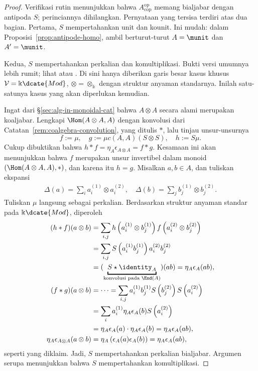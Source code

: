 \begin{proof}
	Verifikasi rutin menunjukkan bahwa
	$A^{\mathrm{op}}_{\mathrm{cop}}$ memang bialjabar dengan antipoda $S$;
	perinciannya dihilangkan. Pernyataan yang tersisa terdiri atas dua bagian.
	Pertama, $S$ mempertahankan unit dan kounit. Ini mudah: dalam
	Proposisi~\ref{prop:antipode-homo}, ambil berturut-turut $A=\munit$ dan
	$A'=\munit$.

	Kedua, $S$ mempertahankan perkalian dan komultiplikasi. Bukti versi umumnya
	lebih rumit; lihat \cite[\S 9, Proposisi 2]{JS91} atau
	\cite[Proposisi 1.22]{AM10}. Di sini hanya diberikan garis besar kasus
	khusus $\mathcal{V}=\Bbbk\dcate{Mod}$,
	$\otimes=\otimes_{\Bbbk}$ dengan struktur anyaman standarnya. Inilah
	satu-satunya kasus yang akan diperlukan kemudian.

	Ingat dari \S\ref{sec:alg-in-monoidal-cat} bahwa $A\otimes A$ secara alami
	merupakan koaljabar. Lengkapi $\Hom(A\otimes A,A)$ dengan konvolusi dari
	Catatan~\ref{rem:coalgebra-convolution}, yang ditulis $\ast$, lalu tinjau
	unsur-unsurnya
	\[ f := \mu, \quad g := \mu c(A, A) (S \otimes S), \quad h := S \mu. 
	\]
	Cukup dibuktikan bahwa
	$h\ast f=\eta_A\epsilon_{A\otimes A}=f\ast g$. Kesamaan ini akan
	menunjukkan bahwa $f$ merupakan unsur invertibel dalam monoid
	$(\Hom(A\otimes A,A),\ast)$, dan karena itu $h=g$. Misalkan $a,b\in A$,
	dan tuliskan ekspansi
	\begin{gather*}
		\Delta(a) = \sum_i a_i^{(1)} \otimes a_i^{(2)}, \quad
		\Delta(b) = \sum_j b_j^{(1)} \otimes b_j^{(2)}.
	\end{gather*}
	Tuliskan $\mu$ langsung sebagai perkalian. Berdasarkan struktur anyaman
	standar pada $\Bbbk\dcate{Mod}$, diperoleh
	\begin{align*}
		(h \ast f)(a \otimes b) & = \sum_{i, j} h\left(a^{(1)}_i \otimes b^{(1)}_j\right) f\left(a^{(2)}_i \otimes b^{(2)}_j\right) \\
		& = \sum_{i, j} S\left( a^{(1)}_i b^{(1)}_j \right) a^{(2)}_i b^{(2)}_j \\
		& = (\underbracket{S \star \identity_A}_{\text{konvolusi pada }\End(A)})(ab) = \eta_A \epsilon_A (ab), \\
		(f \ast g)(a \otimes b) & = \cdots = \sum_{i, j} a^{(1)}_i b^{(1)}_j S\left( b^{(2)}_j \right) S\left( a^{(2)}_i \right) \\
		& = \sum_i a^{(1)}_i \eta_A \epsilon_A(b) S\left( a^{(2)}_i \right) \\
		& = \eta_A \epsilon_A (a) \cdot \eta_A \epsilon_A (b) = \eta_A \epsilon_A(ab), \\
		\eta_A \epsilon_{A \otimes A}(a \otimes b) & = \eta_A\left( \epsilon_A(a)\epsilon_A(b) \right) = \eta_A \epsilon_A(ab),
	\end{align*}
	seperti yang diklaim. Jadi, $S$ mempertahankan perkalian bialjabar. Argumen
	serupa menunjukkan bahwa $S$ mempertahankan komultiplikasi.
\end{proof}

